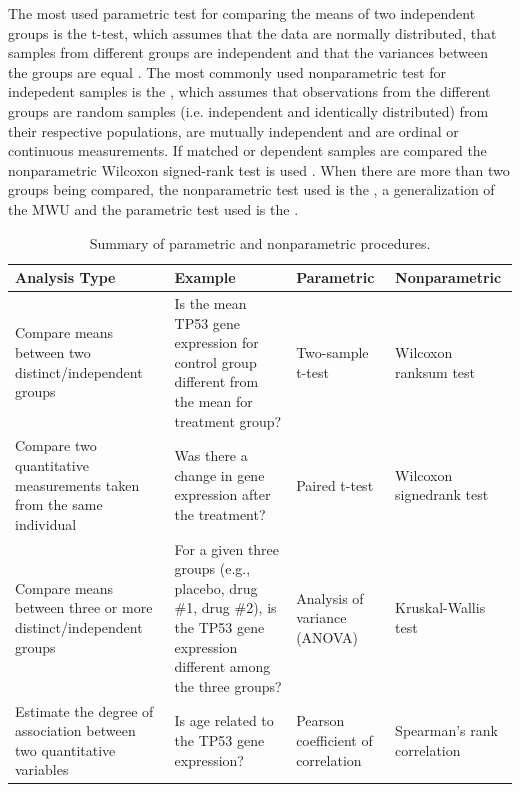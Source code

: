 The most used parametric test for comparing the means of two independent groups is the t-test, which
 assumes that the data are normally distributed, that samples from different groups are independent and that the variances between the groups are equal \cite{kitchen2009nonparametric}. The most commonly used nonparametric test for indepedent samples is the  , which assumes that observations from the different groups are random samples (i.e. independent and identically distributed) from their respective populations, are mutually independent and are ordinal or continuous measurements. If matched or dependent samples are compared  the nonparametric  Wilcoxon signed-rank test is used \cite{whitley2002statistics}.
When there are more than two groups being compared,
the nonparametric test used is the , a generalization of the MWU and the parametric test used is the  \cite{parab2010choosing}.


\bgroup
\def\arraystretch{2.0}%

\begin{table}[h!]
\footnotesize
\centering
\caption{Summary of parametric and nonparametric procedures.}
\label{Parametric-nonparametric}
\begin{tabular}{p{3.5cm}p{4cm}p{3cm}p{3cm}}
\toprule
\textbf{Analysis Type} & \textbf{Example} & \textbf{Parametric} & \textbf{Nonparametric} \\ \midrule
Compare means between two distinct/independent groups & Is the mean TP53 gene expression for control group different from the mean for treatment group? & Two-sample t-test & Wilcoxon ranksum test \\
Compare two quantitative measurements taken from the same individual & Was there a change in gene expression after the treatment? & Paired t-test & Wilcoxon signedrank test \\
Compare means between three or more distinct/independent groups & For a given three groups (e.g., placebo, drug \#1, drug \#2), is the TP53 gene expression different among the three groups? & Analysis of variance (ANOVA) & Kruskal-Wallis test \\
Estimate the degree of association between two quantitative variables & Is age related to the TP53 gene expression? & Pearson coefficient of correlation & Spearman’s rank correlation \\ \bottomrule
\end{tabular}
\end{table}
\egroup

